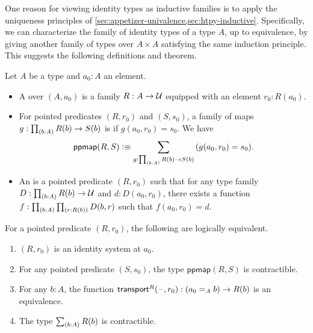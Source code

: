 
\mentalpause

One reason for viewing identity types as inductive families is to apply the uniqueness principles of \autoref{sec:appetizer-univalence,sec:htpy-inductive}.
Specifically, we can characterize the family of identity types of a type $A$, up to equivalence, by giving another family of types over $A\times A$ satisfying the same induction principle.
This suggests the following definitions and theorem.

%
%

\begin{defn}\label{defn:identity-systems}
  Let $A$ be a type and $a_0:A$ an element.
  \begin{itemize}
  \item A 
    over $(A,a_0)$ is a family $R:A\to\mathcal{U}$ equipped with an element $r_0:R(a_0)$.
  \item For pointed predicates $(R,r_0)$ and $(S,s_0)$, a family of maps $g:\prd{b:A} R(b) \to S(b)$ is  if $g(a_0, r_0)=s_0$.
    We have
    \[ \mathsf{ppmap}(R,S) \defeq \sm{g:\prd{b:A} R(b) \to S(b)} (g(a_0, r_0)=s_0).\]
  \item An 
    is a pointed predicate $(R,r_0)$ such that for any type family $D:\prd{b:A} R(b) \to \type$ and $d:D(a_0,r_0)$, there exists a function $f:\prd{b:A}{r:R(b)} D(b,r)$ such that $f(a_0,r_0)=d$.
\end{itemize}
\end{defn}

\begin{thm}\label{thm:identity-systems}
  For a pointed predicate $(R,r_0)$, the following are logically equivalent.
  \begin{enumerate}
  \item $(R,r_0)$ is an identity system at $a_0$.\label{item:identity-systems1}
  \item For any pointed predicate $(S,s_0)$, the type $\mathsf{ppmap}(R,S)$ is contractible.\label{item:identity-systems2}
  \item For any $b:A$, the function $\mathsf{transport}^{R}(\mathord{\hspace{1pt}\text{--}\hspace{1pt}},r_0) : (a_0 =_A b) \to R(b)$ is an equivalence.\label{item:identity-systems3}
  \item The type $\sm{b:A} R(b)$ is contractible.\label{item:identity-systems4}
  \end{enumerate}
\end{thm}

